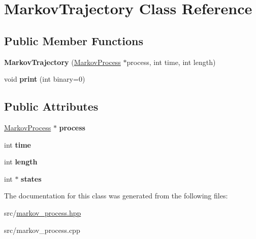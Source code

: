\hypertarget{classMarkovTrajectory}{\section{Markov\-Trajectory Class Reference}
\label{classMarkovTrajectory}
}
\subsection*{Public Member Functions}
\begin{DoxyCompactItemize}
\item 
\hypertarget{classMarkovTrajectory_a87acf0aef9d85e369378d004e06c56de}{{\bfseries Markov\-Trajectory} (\hyperlink{classMarkovProcess}{Markov\-Process} $\ast$process, int time, int length)}\label{classMarkovTrajectory_a87acf0aef9d85e369378d004e06c56de}

\item 
\hypertarget{classMarkovTrajectory_a29bb2d19771e93e6c87204c8ac2b3bd1}{void {\bfseries print} (int binary=0)}\label{classMarkovTrajectory_a29bb2d19771e93e6c87204c8ac2b3bd1}

\end{DoxyCompactItemize}
\subsection*{Public Attributes}
\begin{DoxyCompactItemize}
\item 
\hypertarget{classMarkovTrajectory_ada9138be4456a51a6f86c491079b0a58}{\hyperlink{classMarkovProcess}{Markov\-Process} $\ast$ {\bfseries process}}\label{classMarkovTrajectory_ada9138be4456a51a6f86c491079b0a58}

\item 
\hypertarget{classMarkovTrajectory_ab9a7f6133864c100caee694f7fb5c272}{int {\bfseries time}}\label{classMarkovTrajectory_ab9a7f6133864c100caee694f7fb5c272}

\item 
\hypertarget{classMarkovTrajectory_a12f640932269482c40e2a8efb9ff61c1}{int {\bfseries length}}\label{classMarkovTrajectory_a12f640932269482c40e2a8efb9ff61c1}

\item 
\hypertarget{classMarkovTrajectory_af7aa190f73505e8eb514ca7725572268}{int $\ast$ {\bfseries states}}\label{classMarkovTrajectory_af7aa190f73505e8eb514ca7725572268}

\end{DoxyCompactItemize}


The documentation for this class was generated from the following files\-:\begin{DoxyCompactItemize}
\item 
src/\hyperlink{markov__process_8hpp}{markov\-\_\-process.\-hpp}\item 
src/markov\-\_\-process.\-cpp\end{DoxyCompactItemize}
